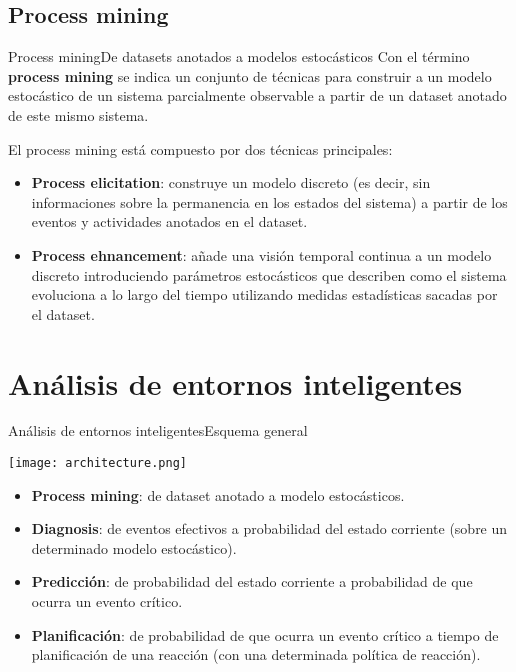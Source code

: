 \documentclass[9pt, handout]{beamer}
\begin{document}
    \subsection{Process mining}
      \begin{frame}{Process mining}{De datasets anotados a modelos estocásticos}
        \pause
        Con el término \textbf{process mining} se indica un conjunto de técnicas para construir a un modelo estocástico de un sistema parcialmente observable a partir de un dataset anotado de este mismo sistema.
        
        \pause
        \vspace{1em}
        El process mining está compuesto por dos técnicas principales:
        \pause
        \begin{itemize}
          \item \textbf{Process elicitation}: construye un modelo discreto (es decir, sin informaciones sobre la permanencia en los estados del sistema) a partir de los eventos y actividades anotados en el dataset.
          \pause
          \item \textbf{Process ehnancement}: añade una visión temporal continua a un modelo discreto introduciendo parámetros estocásticos que describen como el sistema evoluciona a lo largo del tiempo utilizando medidas estadísticas sacadas por el dataset.
        \end{itemize}
      \end{frame}
    
  \section{Análisis de entornos inteligentes}
  
    \begin{frame}{Análisis de entornos inteligentes}{Esquema general}
      \vspace{-1em}
      \begin{center}
        \texttt{[image: architecture.png]}
      \end{center}
      
      \pause
      \begin{itemize}
        \item \textbf{Process mining}: de dataset anotado a modelo estocásticos.
        \pause
        \item \textbf{Diagnosis}: de eventos efectivos a probabilidad del estado corriente (sobre un determinado modelo estocástico).
        \pause
        \item \textbf{Predicción}: de probabilidad del estado corriente a probabilidad de que ocurra un evento crítico.
        \pause
        \item \textbf{Planificación}: de probabilidad de que ocurra un evento crítico a tiempo de planificación de una reacción (con una determinada política de reacción).
      \end{itemize}
    \end{frame}
  
\end{document}
